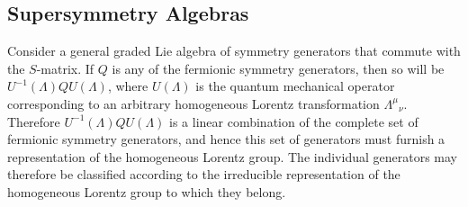 \subsection{Supersymmetry Algebras}

\newcommand{\WeylQ}{\mathrm{Q}}
\newcommand{\MajoranaQ}{Q}

Consider a general graded Lie algebra of symmetry generators that commute
with the \(S\)-matrix. If \(Q\) is any of the fermionic symmetry generators,
then so will be \(U^{-1}(\Lambda)QU(\Lambda)\), where \(U(\Lambda)\) is the
quantum mechanical operator corresponding to an arbitrary homogeneous
Lorentz transformation \(\Lambda^\mu{}_\nu\). Therefore
\(U^{-1}(\Lambda)QU(\Lambda)\) is a linear combination of the complete set
of fermionic symmetry generators, and hence this set of generators must
furnish a representation of the homogeneous Lorentz group. The individual
generators may therefore be classified according to the irreducible
representation of the homogeneous Lorentz group to which they belong.

